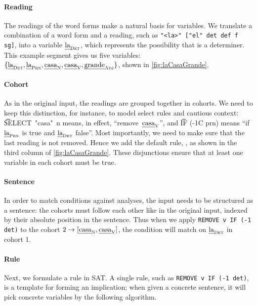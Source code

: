 \paragraph{Reading}
The readings of the word forms make a natural basis for variables.
We translate a combination of a word form and a reading, such as \texttt{"<la>" ["el" det def f sg]}, into a variable $\text{\em la}_{\text{\sc Det}}$, which represents the possibility that \la{} is a determiner. This example segment gives us five variables: $\{ \text{\em la}_{\text{\sc Det}} , \text{\em la}_{\text{\sc Prn}} , \text{\em casa}_{\text{\sc N}} , \text{\em casa}_{\text{\sc V}},  \text{\em grande}_{\text{\sc Adj}} \}$, shown in \ref{fig:laCasaGrande}.

\paragraph{Cohort} As in the original input, the readings are grouped together in cohorts. We need to keep this distinction, for instance, to model {\sc select} rules and cautious context: 
\t{SELECT~"casa"~n} means, in effect, ``remove~$\text{\em casa}_{\text{\sc V}}$'', and \t{IF (-1C prn)} means ``if $\text{\em la}_{\text{\sc Prn}}$ is true and $\text{\em la}_{\text{\sc Det}}$ false''. 
%
Most importantly, we need to make sure that the last reading is not removed. Hence we add the default rule, , as shown in the third column of \ref{fig:laCasaGrande}. 
These disjunctions ensure that at least one variable in each cohort must be true.



\paragraph{Sentence}
In order to match conditions against analyses, the input needs to be structured as a sentence: the cohorts must follow each other like in the original input, indexed by their absolute position in the sentence. Thus when we apply \texttt{REMOVE v IF (-1 det)} to the cohort $2 \rightarrow [\text{\em casa}_{\text{\sc N}} , \text{\em casa}_{\text{\sc V}}]$, the condition will match on $\text{\em la}_{\text{\sc Det}}$ in cohort 1.


\paragraph{Rule}

Next, we formulate a rule in SAT. A single rule, such as \texttt{REMOVE v IF (-1 det)}, is a template for forming an implication; when given a concrete sentence, it will pick concrete variables by the following algorithm.

